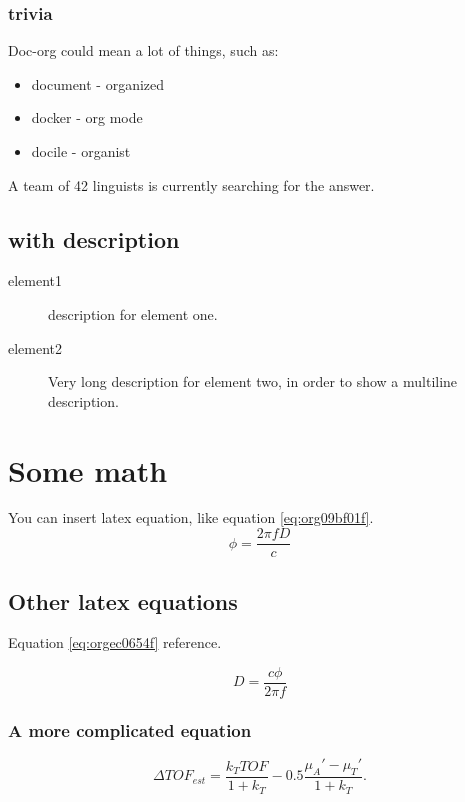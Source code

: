 \subsubsection{trivia}
\label{sec:org941374c}
Doc-org could mean a lot of things, such as:
\begin{itemize}
\item document - organized
\item docker - org mode
\item docile - organist
\end{itemize}
A team of 42 linguists is currently searching for the answer.
\subsection{with description}
\label{sec:orgc703ca0}
\begin{description}
\item[{element1}] description for element one.
\item[{element2}] Very long description for element two, in order to show a
multiline description.
\end{description}

\section{Some math}
\label{sec:org41a5516}
You can insert latex equation, like equation \ref{eq:org09bf01f}.
\begin{equation}
\label{eq:org09bf01f}
\phi = \frac{2\pi fD}{c}
\end{equation}
\subsection{Other latex equations}
\label{sec:org3b85686}
Equation \ref{eq:orgec0654f} reference.

\begin{equation}
\label{eq:orgec0654f}
D = \frac{c\phi}{2\pi f}
\end{equation}

\subsubsection{A more complicated equation}
\label{sec:org320d23c}

\begin{equation}
\Delta TOF_{est} = \frac{k_T TOF}{1+k_T } - 0.5 \frac{\mu_A' - \mu_T'}{1+k_T}.
\end{equation}

